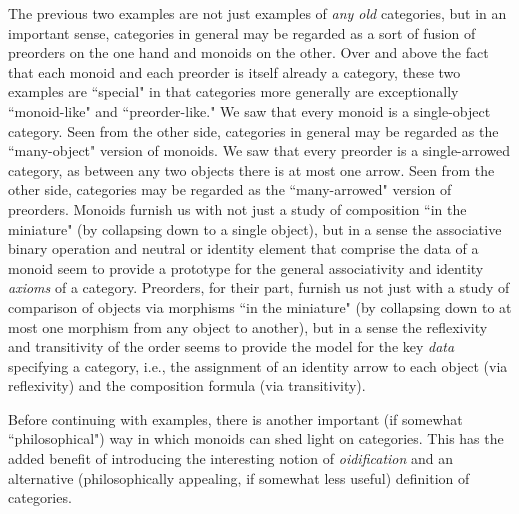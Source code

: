 \documentclass[11pt]{book}
\theoremstyle{definition}
\theoremstyle{definition}
\theoremstyle{definition}
\theoremstyle{theorem}
\theoremstyle{definition}
\begin{document}
	The previous two examples are not just examples of \textit{any old} categories, but in an important sense, categories in general may be regarded as a sort of fusion of preorders on the one hand and monoids on the other. Over and above the fact that each monoid and each preorder is itself already a category, these two examples are ``special" in that categories more generally are exceptionally ``monoid-like" and ``preorder-like." We saw that every monoid is a single-object category. Seen from the other side, categories in general may be regarded as the ``many-object" version of monoids. We saw that every preorder is a single-arrowed category, as between any two objects there is at most one arrow. Seen from the other side, categories may be regarded as the ``many-arrowed" version of preorders. Monoids furnish us with not just a study of composition ``in the miniature" (by collapsing down to a single object), but in a sense the associative binary operation and neutral or identity element that comprise the data of a monoid seem to provide a prototype for the general associativity and identity \textit{axioms} of a category. Preorders, for their part, furnish us not just with a study of comparison of objects via morphisms ``in the miniature" (by collapsing down to at most one morphism from any object to another), but in a sense the reflexivity and transitivity of the order seems to provide the model for the key \textit{data} specifying a category, i.e., the assignment of an identity arrow to each object (via reflexivity) and the composition formula (via transitivity).\par 
Before continuing with examples, there is another important (if somewhat ``philosophical") way in which monoids can shed light on categories. This has the added benefit of introducing the interesting notion of \textit{oidification} and an alternative (philosophically appealing, if somewhat less useful) definition of categories.
\end{document}
